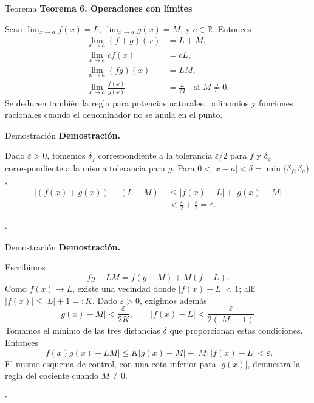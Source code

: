 \documentclass[12pt,aspectratio=169]{beamer}
\newcommand{\R}{\mathbb{R}}
\begin{document}
\begin{frame}[t,allowframebreaks]{Teorema}
{\color{azul}\bfseries Teorema 6. Operaciones con límites}\par\medskip

Sean $\lim_{x\to a}f(x)=L$, $\lim_{x\to a}g(x)=M$, y $c\in\R$. Entonces
\begin{align*}
 \lim_{x\to a}(f+g)(x)&=L+M,\\
 \lim_{x\to a}cf(x)&=cL,\\
 \lim_{x\to a}(fg)(x)&=LM,\\
 \lim_{x\to a}\frac{f(x)}{g(x)}&=\frac LM\quad\text{si }M\ne0.
\end{align*}
Se deducen también la regla para potencias naturales, polinomios y funciones racionales cuando el denominador no se anula en el punto.
\end{frame}


\begin{frame}[t,allowframebreaks]{Demostración}
{\color{azul}\bfseries Demostración.}\par\smallskip

Dado $\varepsilon>0$, tomemos $\delta_f$ correspondiente a la tolerancia $\varepsilon/2$ para $f$ y $\delta_g$ correspondiente a la misma tolerancia para $g$. Para $0<|x-a|<\delta=\min\{\delta_f,\delta_g\}$,
\begin{align*}
 |(f(x)+g(x))-(L+M)|&\le|f(x)-L|+|g(x)-M|\\
 &<\frac\varepsilon2+\frac\varepsilon2=\varepsilon.
\end{align*}

\hfill $\square$
\end{frame}


\begin{frame}[t,allowframebreaks]{Demostración}
{\color{azul}\bfseries Demostración.}\par\smallskip

Escribimos
\[
 fg-LM=f(g-M)+M(f-L).
\]
Como $f(x)\to L$, existe una vecindad donde $|f(x)-L|<1$; allí $|f(x)|\le |L|+1=:K$. Dado $\varepsilon>0$, exigimos además
\[
 |g(x)-M|<\frac{\varepsilon}{2K},\qquad
 |f(x)-L|<\frac{\varepsilon}{2(|M|+1)}.
\]
Tomamos el mínimo de las tres distancias $\delta$ que proporcionan estas condiciones. Entonces
\[
 |f(x)g(x)-LM|\le K|g(x)-M|+|M|\,|f(x)-L|<\varepsilon.
\]
El mismo esquema de control, con una cota inferior para $|g(x)|$, demuestra la regla del cociente cuando $M\ne0$.

\hfill $\square$
\end{frame}
\end{document}
